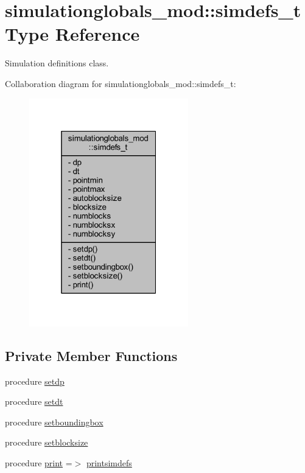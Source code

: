 \hypertarget{structsimulationglobals__mod_1_1simdefs__t}{}\section{simulationglobals\+\_\+mod\+:\+:simdefs\+\_\+t Type Reference}
\label{structsimulationglobals__mod_1_1simdefs__t}


Simulation definitions class.  




Collaboration diagram for simulationglobals\+\_\+mod\+:\+:simdefs\+\_\+t\+:\nopagebreak
\begin{figure}[H]
\begin{center}
\leavevmode
\includegraphics[width=196pt]{structsimulationglobals__mod_1_1simdefs__t__coll__graph}
\end{center}
\end{figure}
\subsection*{Private Member Functions}
\begin{DoxyCompactItemize}
\item 
procedure \mbox{\hyperlink{structsimulationglobals__mod_1_1simdefs__t_acfabceeeb5352b7b36431f88558372df}{setdp}}
\item 
procedure \mbox{\hyperlink{structsimulationglobals__mod_1_1simdefs__t_ab31ff2c6186712023df66976f48ee3e7}{setdt}}
\item 
procedure \mbox{\hyperlink{structsimulationglobals__mod_1_1simdefs__t_a87f8e04c862d786f6dd7e0216c84b469}{setboundingbox}}
\item 
procedure \mbox{\hyperlink{structsimulationglobals__mod_1_1simdefs__t_af25c86cae261d52fdf9e6825d350fa5f}{setblocksize}}
\item 
procedure \mbox{\hyperlink{structsimulationglobals__mod_1_1simdefs__t_abac6acf320c42d22364f66677542fbfe}{print}} =$>$ \mbox{\hyperlink{namespacesimulationglobals__mod_a54196bff569fc838730ba39a722319ff}{printsimdefs}}
\end{DoxyCompactItemize}
